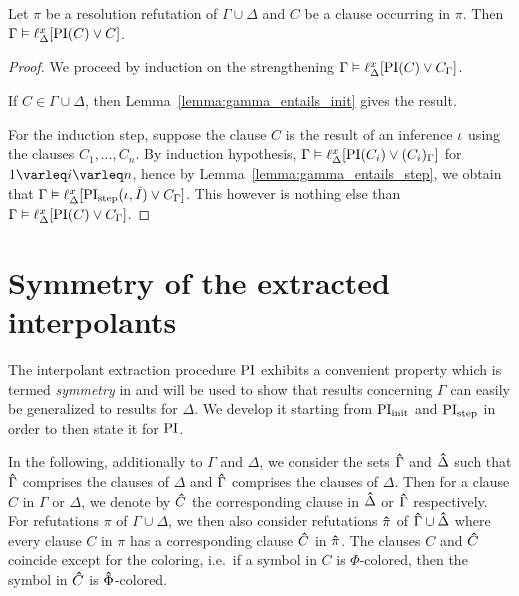 \begin{lemma}
	\label{lemma:gamma_entails_lifted_interpolant}
	Let $\pi$ be a resolution refutation of $\Gamma \cup \Delta$ and $C$ be a clause occurring in $\pi$.
	Then $\Gamma \entails \lifdelta{\PI(C) \lor\nolinebreak C}$.
\end{lemma}
\begin{proof}
	We proceed by induction on the strengthening
	$\Gamma \entails \lifdelta{\PI(C) \lor\nolinebreak C_\Gamma}$.

	If $C \in \Gamma\cup\Delta$, then Lemma~\ref{lemma:gamma_entails_init} gives the result.

	For the induction step, suppose the clause $C$ is the result of an inference $\iota$ using the clauses $C_1, \dots, C_n$.
	By induction hypothesis, $\Gamma \entails \lifdelta{\PI(C_i) \lor\nolinebreak (C_i)_\Gamma}$ for $1\varleq i\varleq n$, hence
	by Lemma~\ref{lemma:gamma_entails_step}, we obtain that 
	$\Gamma \vDash \ell_{\Delta}^{x}[\operatorname{PI}_{\mathrm{step}}(\iota, \bar I) \lor C_\Gamma]$.
	This however is nothing else than $\Gamma \vDash \ell_{\Delta}^{x}[\operatorname{PI}(C) \lor C_\Gamma]$.
\end{proof}




\section{Symmetry of the extracted interpolants}
\label{sec:symmetry}

The interpolant extraction procedure $\operatorname{PI}$ exhibits a convenient property which is termed \emph{symmetry} in \cite[Definition 3]{interpolantStrenth} and will be used to show that results concerning $\Gamma$ can easily be generalized to results for $\Delta$.
We develop it starting from $\operatorname{PI}_{\mathrm{init}}$ and $\operatorname{PI}_{\mathrm{step}}$ in order to then state it for $\operatorname{PI}$. 

\newcommand{\primex}[1]{\ensuremath{\bhat{#1}}}

In the following, additionally to $\Gamma$ and $\Delta$, we consider the sets $\primex{\Gamma}$ and $\primex{\Delta}$ such that $\primex{\Gamma}$ comprises the clauses of $\Delta$ and $\primex{\Gamma}$ comprises the clauses of $\Delta$. 
Then for a clause $C$ in $\Gamma$ or $\Delta$, we denote by $\primex C$ the corresponding clause in $\primex \Delta$ or $\primex \Gamma$ respectively.
For refutations $\pi$ of $\Gamma\cup\Delta$, we then also consider refutations $\primex \pi$ of $\primex\Gamma \cup \primex\Delta$ where every clause $C$ in $\pi$ has a corresponding clause $\primex C$ in $\primex \pi$. The clauses $C$ and $\primex C$ coincide except for the coloring, i.e.\ if a symbol in $C$ is $\Phi$-colored, then the symbol in $\primex C$ is $\primex \Phi$-colored.

